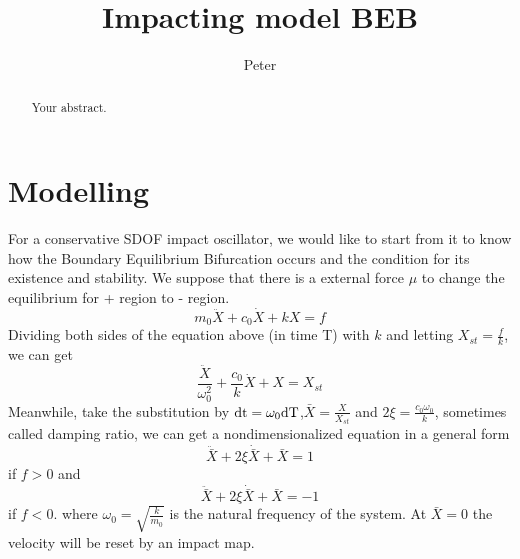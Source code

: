 \documentclass{article}
\title{Impacting model BEB }
\author{Peter}
\begin{document}
\maketitle

\begin{abstract}
Your abstract.
\end{abstract}

\section{Modelling}
For a conservative SDOF impact oscillator, we would like to start from it to know how the Boundary Equilibrium Bifurcation occurs and the condition for its existence and stability. We suppose that there is a external force $\mu$ to change the equilibrium for + region to - region.  
\begin{equation}
 m_0 \ddot{X} + c_0 \dot{X} + k X =f
\end{equation}
Dividing both sides of the equation above (in time T) with $k$ and letting $X_{st}=\frac{f}{k}$, we can get 
\begin{equation}
    \frac{\ddot{X}}{\omega^{2}_0}+\frac{c_0}{k}\dot{X}+X=X_{st}
    \label{eq:2}
\end{equation}
Meanwhile, take the substitution by $ \displaystyle  \rm{d} t= \omega_0 \rm{d} T$,$ \displaystyle  \bar X=\frac{X}{X_{st}}$ and $ \displaystyle 2\xi=\frac{c_0\omega_0}{k}$, sometimes called damping ratio, we can get a nondimensionalized  equation in a general form
\begin{equation}
    \ddot{\bar{X}} +2\xi \dot{\bar{X}}+ \bar{X}=1
    \label{eq:nondim Equi1}
\end{equation} if $f>0$ and 
\begin{equation}
    \ddot{\bar{X}} +2\xi \dot{\bar{X}}+ \bar{X}=-1
     \label{eq:nondim Equi2}
\end{equation} if $f<0$.
where $ \displaystyle \omega_0=\sqrt{\frac{k}{m_0}}$ is the natural frequency of the system.
At $\bar X=0$ the velocity will be reset by an impact map. 
\end{document}
